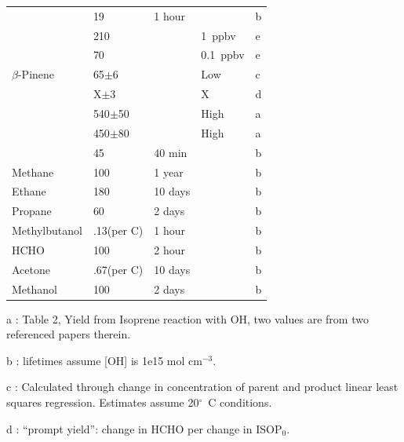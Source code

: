 \begin{table}
\begin{threeparttable}
\begin{tabular}{  l  l  l  l  l  }
                        & 19              & 1 hour &              & b        \\ %
                        & 210             &        & 1~ppbv        & e        \\
                        & 70              &        & 0.1~ppbv      & e        \\
        $\beta$-Pinene  & 65$\pm$6        &        & Low           & c      \\ 
                        & X$\pm$3         &        & X             & d      \\ 
                        & 540$\pm$50      &        & High          & a     \\ 
                        & 450$\pm$80      &        & High          & a      \\ 
                        & 45              & 40 min &              & b      \\ %
        Methane 	      & 100             & 1 year  &             & b     \\ 
        Ethane          & 180             & 10 days &             & b     \\ 
        Propane         & 60              & 2 days  &             & b     \\ 
        Methylbutanol   & .13(per C)    & 1 hour  &             & b     \\ 
        HCHO            & 100             & 2 hour  &             & b     \\ 
        Acetone         & .67(per C)      & 10 days &             & b     \\ 
        Methanol        & 100             & 2 days  &             & b     \\ %
        \bottomrule
      \end{tabular}
      \begin{tablenotes} %
        \item a \citet{AtkinsonArey2003}: Table 2, Yield from Isoprene reaction with OH, two values are from two referenced papers therein.
        \item b \citet{Palmer2003}: lifetimes assume [OH] is 1e15 mol cm$^{-3}$.
        \item c \citep{Lee2006}: Calculated through change in concentration of parent and product linear least squares regression.
        Estimates assume 20$^\circ$~C conditions.
        \item d \citet{Wolfe2016}: ``prompt yield'': change in HCHO per change in ISOP$_0$.

\end{tablenotes}
\end{threeparttable}
\end{table}
